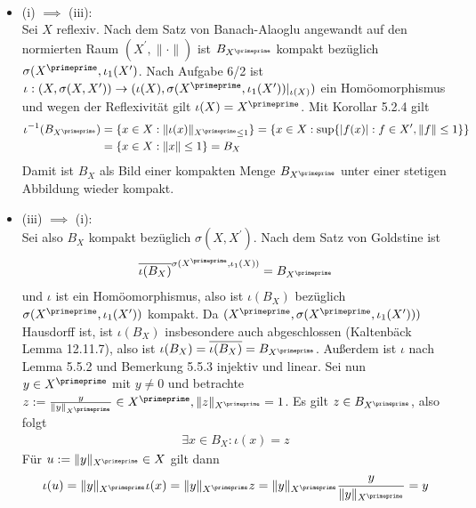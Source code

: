 \begin{solution}
\leavevmode \\
\begin{itemize}
  \item (i) $\implies$ (iii): \\
  Sei $X$ reflexiv. Nach dem Satz von Banach-Alaoglu
  angewandt auf den normierten Raum $(X^{\prime},\|\cdot\|)$ ist $B_{X^{\primeprime}}$
  kompakt bezüglich $\sigma(X^{\primeprime}, \iota_1(X^{\prime})$.
  Nach Aufgabe 6/2 ist $\iota: (X,\sigma(X,X^{\prime})) \to
  (\iota(X),\sigma(X^{\primeprime},\iota_1(X^{\prime}))|_{\iota(X)})$ ein Homöomorphismus
  und wegen der Reflexivität gilt $\iota(X) = X^{\primeprime}$.
  Mit Korollar 5.2.4 gilt
  \begin{align*}
    \iota^{-1}(B_{X^{\primeprime}}) &= \{x \in X: \|\iota(x)\|_{X^{\primeprime} \leq 1}\}
    = \{x \in X: \sup\{|f(x)|: f \in X^{\prime}, \|f\| \leq 1 \}\} \\
    &= \{x \in X: \|x\| \leq 1\} = B_X
  \end{align*}
  Damit ist $B_X$ als Bild einer kompakten Menge $B_{X^{\primeprime}}$ unter einer
  stetigen Abbildung wieder kompakt.
  \item (iii) $\implies$ (i): \\
  Sei also $B_X$ kompakt bezüglich $\sigma(X,X^{\prime})$. Nach dem Satz von Goldstine
  ist
  \begin{align*}
    \overline{\iota(B_X)}^{\sigma(X^{\primeprime},\iota_1(X))} = B_{X^{\primeprime}}
  \end{align*}
  und $\iota$ ist ein Homöomorphismus, also ist $\iota(B_X)$ bezüglich
  $\sigma(X^{\primeprime}, \iota_1(X^{\prime}))$ kompakt. Da
  $(X^{\primeprime}, \sigma(X^{\primeprime}, \iota_1(X^{\prime})))$ Hausdorff ist,
  ist $\iota(B_X)$ insbesondere auch abgeschlossen (Kaltenbäck Lemma 12.11.7),
  also ist $\iota(B_X) = \overline{\iota(B_X)} = B_{X^{\primeprime}}$.
  Außerdem ist $\iota$ nach Lemma 5.5.2 und Bemerkung 5.5.3 injektiv und linear.
  Sei nun $y \in X^{\primeprime}$ mit $y \neq 0$ und betrachte
  $z := \frac{y}{\|y\|_{X^{\primeprime}}} \in X^{\primeprime}, \|z\|_{X^{\primeprime}} = 1$.
  Es gilt $z \in B_{X^{\primeprime}}$, also folgt
  \begin{align*}
    \exists x \in B_X: \iota(x) = z
  \end{align*}
  Für $u := \|y\|_{X^{\primeprime}} \in X$ gilt dann
  \begin{align*}
    \iota(u) = \|y\|_{X^{\primeprime}}\iota(x) = \|y\|_{X^{\primeprime}}z
    = \|y\|_{X^{\primeprime}} \frac{y}{\|y\|_{X^{\primeprime}}} = y

\end{align*}
\end{itemize}
\end{solution}

